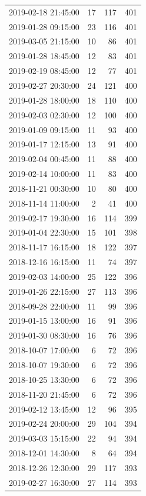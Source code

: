 \begin{tabular}{lrrr}
2019-02-18 21:45:00 & 17 & 117 & 401 \\
2019-01-28 09:15:00 & 23 & 116 & 401 \\
2019-03-05 21:15:00 & 10 & 86 & 401 \\
2019-01-28 18:45:00 & 12 & 83 & 401 \\
2019-02-19 08:45:00 & 12 & 77 & 401 \\
2019-02-27 20:30:00 & 24 & 121 & 400 \\
2019-01-28 18:00:00 & 18 & 110 & 400 \\
2019-02-03 02:30:00 & 12 & 100 & 400 \\
2019-01-09 09:15:00 & 11 & 93 & 400 \\
2019-01-17 12:15:00 & 13 & 91 & 400 \\
2019-02-04 00:45:00 & 11 & 88 & 400 \\
2019-02-14 10:00:00 & 11 & 83 & 400 \\
2018-11-21 00:30:00 & 10 & 80 & 400 \\
2018-11-14 11:00:00 & 2 & 41 & 400 \\
2019-02-17 19:30:00 & 16 & 114 & 399 \\
2019-01-04 22:30:00 & 15 & 101 & 398 \\
2018-11-17 16:15:00 & 18 & 122 & 397 \\
2018-12-16 16:15:00 & 11 & 74 & 397 \\
2019-02-03 14:00:00 & 25 & 122 & 396 \\
2019-01-26 22:15:00 & 27 & 113 & 396 \\
2018-09-28 22:00:00 & 11 & 99 & 396 \\
2019-01-15 13:00:00 & 16 & 91 & 396 \\
2019-01-30 08:30:00 & 16 & 76 & 396 \\
2018-10-07 17:00:00 & 6 & 72 & 396 \\
2018-10-07 19:30:00 & 6 & 72 & 396 \\
2018-10-25 13:30:00 & 6 & 72 & 396 \\
2018-11-20 21:45:00 & 6 & 72 & 396 \\
2019-02-12 13:45:00 & 12 & 96 & 395 \\
2019-02-24 20:00:00 & 29 & 104 & 394 \\
2019-03-03 15:15:00 & 22 & 94 & 394 \\
2018-12-01 14:30:00 & 8 & 64 & 394 \\
2018-12-26 12:30:00 & 29 & 117 & 393 \\
2019-02-27 16:30:00 & 27 & 114 & 393 \\

\end{tabular}
